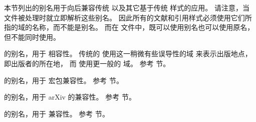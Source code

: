 
本节列出的别名用于向后兼容传统 \BibTeX 以及其它基于传统 \BibTeX 样式的应用。
请注意，当  文件被处理时就立即解析这些别名。
因此所有的文献和引用样式必须使用它们所指的域的名称，而不能是别名。
而在  文件中，既可以使用别名也可以使用原名，但不能同时使用。


\begin{fieldlist}


  的别名，用于 \BibTeX 相容性。
传统的 \BibTeX 使用这一稍微有些误导性的域  来表示出版地点，即出版者的所在地，
而 \biblatex 使用更一般的  域。
参考  节。




 的别名，用于  宏包兼容性。
参考  节。




 的别名，用于 arXiv 的兼容性。
参考  节。




 的别名，用于 \BibTeX 兼容性。
参考  节。




\end{fieldlist}
